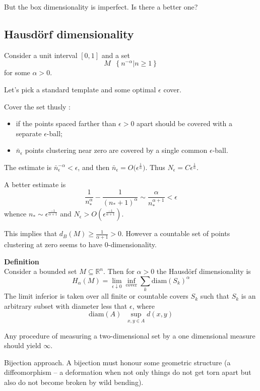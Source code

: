 \documentclass[a4paper]{article}
\newcommand{\obj}[1]{{\left\{ #1 \right \}}}
\newcommand{\clo}[1]{{\left [ #1 \right ]}}
\newcommand{\induc}[1]{{\left . #1 \right \vert}}
\newcommand{\Real}{\mathbb{R}}
\newcommand{\defn}{\mathop{\overset{\Delta}{=}}\nolimits}
\begin{document}
But the box dimensionality is imperfect. Is there a better one?

\subsection{Hausd\"orf dimensionality} %
\label{sub:hausdorf_dimensionality}

Consider a unit interval $\clo{0,1}$ and a set 
\[M \defn \obj{ \induc{ n^{-\alpha} } n\geq 1}\]
for some $\alpha>0$.

Let's pick a standard template and some optimal $\epsilon$ cover.

Cover the set thusly : \begin{itemize}
	\item if the points spaced farther than $\epsilon>0$ apart should be covered with a separate $\epsilon$-ball;
	\item $\bar{n}_\epsilon$ points clustering near zero are covered by a single common $\epsilon$-ball.
\end{itemize}
The estimate is $\bar{n}_\epsilon ^ {-\alpha} < \epsilon$, and then $\bar{n}_\epsilon = O\big(\epsilon^\frac{1}{\alpha}\big)$. Thus $N_\epsilon = C\epsilon^\frac{1}{\alpha}$.

A better estimate is 
\[\frac{1}{n_*^\alpha} - \frac{1}{(n_*+1)^\alpha}\sim \frac{\alpha}{n_*^{\alpha+1}} < \epsilon\]
whence $n_*\sim \epsilon^\frac{-1}{\alpha+1}$ and $N_\epsilon > O(\epsilon^\frac{-1}{\alpha+1})$.

This implies that $d_B(M) \geq \frac{1}{\alpha+1}>0$.
However a countable set of points clustering at zero seems to have $0$-dimensionality.

\noindent\textbf{Definition}\hfill\\

Consider a bounded set $M\subseteq \Real^n$. Then for $\alpha>0$ the Hausd\"orf dimensionality is 
\[H_\alpha(M) = \lim_{\epsilon\downarrow 0} \inf_{\text{cover}} \sum_{k} \text{diam}(S_k)^\alpha\]
The limit inferior is taken over all finite or countable covers $S_k$ such that $S_k$ is an arbitrary subset with diameter less that $\epsilon$, where \[\text{diam}(A) \defn \sup_{x,y\in A} d(x,y)\]

Any procedure of measuring a two-dimensional set by a one dimensional measure should yield $\infty$.

Bijection approach.
A bijection must honour some geometric structure (a diffeomorphism -- a deformation when not only things do not get torn apart but also do not become broken by wild bending).
\end{document}
